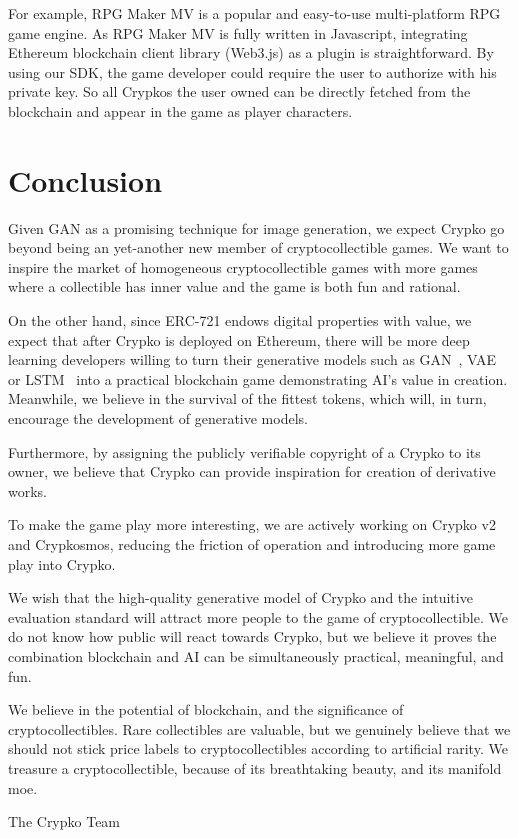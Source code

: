 \documentclass[a4paper]{article}
\begin{document}
For example, RPG Maker MV \cite{rpgmaker} is a popular and easy-to-use multi-platform RPG game engine. As RPG Maker MV is fully written in Javascript, integrating Ethereum blockchain client library (Web3.js) as a plugin is straightforward. By using our SDK, the game developer could require the user to authorize with his private key. So all Crypkos the user owned can be directly fetched from the blockchain and appear in the game as player characters.


\section{Conclusion}

Given GAN as a promising technique for image generation, we expect Crypko go beyond being an yet-another new member of cryptocollectible games. 
We want to inspire the market of homogeneous cryptocollectible games with more games where a collectible has inner value and the game is both fun and rational.

On the other hand, since ERC-721 endows digital properties with value, 
we expect that after Crypko is deployed on Ethereum, 
there will be more deep learning developers willing to turn their generative models such as GAN~\cite{goodfellow2014generative}, VAE~\cite{kingma2013auto} or LSTM~\cite{hochreiter1997long} 
into a practical blockchain game demonstrating AI's value in creation. 
Meanwhile, we believe in the survival of the fittest tokens, which will, in turn, encourage the development of generative models.

Furthermore, by assigning the publicly verifiable copyright of a Crypko to its owner, we believe that Crypko can provide inspiration for creation of derivative works.

To make the game play more interesting, we are actively working on Crypko v2 and Crypkosmos, reducing the friction of operation and introducing more game play into Crypko.

We wish that the high-quality generative model of Crypko and the intuitive evaluation standard will attract more people to the game of cryptocollectible. We do not know how public will react towards Crypko, but we believe it proves the combination blockchain and AI can be simultaneously practical, meaningful, and fun.

We believe in the potential of blockchain, and the significance of cryptocollectibles.
Rare collectibles are valuable, but we genuinely believe that we should not stick price labels to cryptocollectibles according to artificial rarity. We treasure a cryptocollectible, because of its breathtaking beauty, and its manifold moe.

\vspace{5mm}

\begin{flushright}
 The Crypko Team
\end{flushright}



\end{document}
